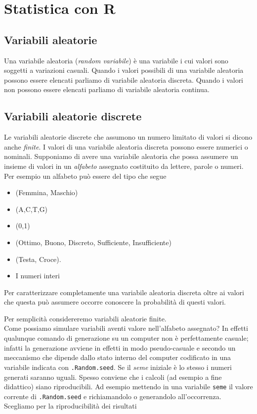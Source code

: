 \documentclass[onecolumn,12pt]{book}
\author{Federico Comoglio e  Maurizio Rinaldi}
\begin{document}

\markright{\today}
\thispagestyle{empty}
\maketitle
\newpage
\thispagestyle{empty}
\tableofcontents
\newpage
\thispagestyle{empty}
 \mainmatter
\chapter{Statistica con \textsf{R}}
\section{Variabili aleatorie}
Una variabile aleatoria (\emph{random variabile}) \`e
 una variabile i cui valori sono soggetti a variazioni casuali. Quando i valori possibili di una variabile aleatoria  possono essere elencati parliamo di variabile aleatoria discreta. Quando i valori non possono essere elencati parliamo di variabile aleatoria continua.

\section{Variabili aleatorie discrete}
Le variabili aleatorie  discrete che  assumono un numero limitato di valori si dicono anche \emph{finite}.  I valori di una variabile aleatoria discreta possono essere numerici o nominali.
 Supponiamo di avere una variabile aleatoria che possa assumere un insieme di valori in  un \emph{alfabeto} assegnato costituito da lettere, parole o numeri. Per esempio un alfabeto pu\`o essere del tipo che segue
\begin{itemize}
\item{}(Femmina, Maschio)
\item{}(A,C,T,G)
\item{} (0,1)
\item{}(Ottimo, Buono, Discreto, Sufficiente, Insufficiente)
\item{} (Testa, Croce).
\item{} I numeri interi
\end{itemize}
Per caratterizzare completamente una variabile aleatoria discreta oltre ai valori che questa pu\`o  assumere occorre conoscere la probabilit\`a  di questi valori.


Per semplicit\`a considereremo variabili aleatorie finite.\\
Come possiamo simulare variabili aventi valore nell'alfabeto assegnato?
In effetti qualunque comando di generazione su un computer non \`e perfettamente casuale; infatti la generazione avviene in effetti in modo pseudo-casuale e  secondo un meccanismo che dipende dallo stato interno del computer codificato in una variabile indicata con \texttt{.Random.seed}. Se il {\it seme} iniziale \`e lo stesso i numeri generati saranno uguali. Spesso conviene che i calcoli (ad esempio a fine didattico) siano riproducibili. Ad esempio mettendo in una variabile \texttt{seme} il valore corrente di \texttt{.Random.seed} e richiamandolo o generandolo all'occorrenza. Scegliamo per la riproducibilit\`a dei risultati
\end{document}

